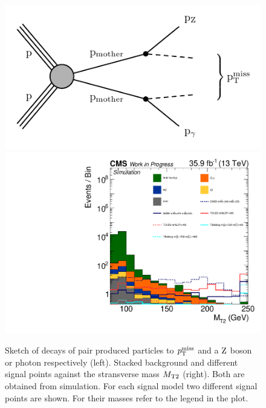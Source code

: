 \begin{figure}
 \centering
 \includegraphics[width=\pairwidth]{figures/mt2/graph}
 \includegraphics[width=\pairwidth]{figures/mt2/onZ_LL_mt2_log}
 \caption{Sketch of decays of pair produced particles to $p_{\mathrm{T}}^\text{miss}$ and a $\mathrm{Z}$ boson or photon respectively (left). Stacked background and different signal points against the stransverse mass $M_{\mathrm{T2}}$ (right). Both are obtained from simulation. For each signal model two different signal points are shown. For their masses refer to the legend in the plot.}
 \label{fig:mt2}
\end{figure}


